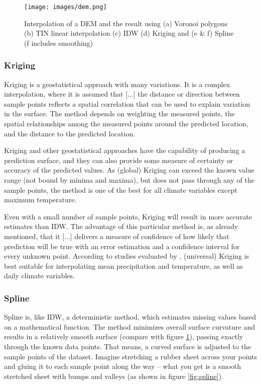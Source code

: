 \begin{figure}
	\texttt{[image: images/dem.png]}
	\caption{Interpolation of a DEM and the result using (a) Voronoi polygons (b) TIN linear interpolation (c) IDW (d) Kriging and (e \& f) Spline (f includes smoothing) \cite{mitas_spatial_1999}}
	\label{fig:dem_mitas}
\end{figure}


\subsubsection{Kriging}

Kriging is a geostatistical approach with many variations. It is a complex interpolation, where it is assumed that \ldq{}[...] the distance or direction between sample points reflects a spatial correlation that can be used to explain variation in the surface\rdq{}. \cite[p.11605]{elumalai_spatial_2017} The method depends on weighting the measured points, the spatial relationships among the measured points around the predicted location, and the distance to the predicted location. \cite{wenjing_cao_study_2009}

Kriging and other geostatistical approaches have the capability of producing a prediction surface, and they can also provide some measure of certainty or accuracy of the predicted values. \cite{samanta_interpolation_2012} As (global) Kriging can exceed the known value range (not bound by minima and maxima), but does not pass through any of the sample points, the method is one of the best for all climate variables except maximum temperature. \cite{gis_resources_choosing_2013}

Even with a small number of sample points, Kriging will result in more accurate estimates than IDW. \cite{lam_spatial_2009} The advantage of this particular method is, as already mentioned, that it \ldq{}[...] delivers a measure of confidence of how likely that prediction will be true\rdq{} with an error estimation and a confidence interval for every unknown point. \cite{lam_spatial_2009} According to studies evaluated by \citeauthor{hofstra_comparison_2008}, (universal) Kriging is best suitable for interpolating mean precipitation and temperature, as well as daily climate variables. 

\subsubsection{Spline}

Spline is, like IDW, a deterministic method, which estimates missing values based on a mathematical function. The method minimizes overall \ldq{}surface curvature\rdq{} and results in a relatively smooth surface (compare with figure \ref{fig:dem_mitas}), passing exactly through the known data points. \cite{samanta_interpolation_2012} That means, a curved surface is adjusted to the sample points of the dataset. \ldq{}Imagine stretching a rubber sheet across your points and gluing it to each sample point along the way -- what you get is a smooth stretched sheet with bumps and valleys\rdq{} (as shown in figure \ref{fig:spline}). \cite{wasser_going_2020}

